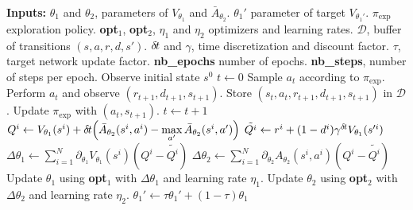 \begin{algorithmic}
	\STATE \textbf{Inputs:}
	\STATE $\theta_1$ and $\theta_2$, parameters of
	$V_{\theta_1}$ and $\bar{A}_{\theta_2}$.
	\STATE $\theta_1'$ parameter of target $V_{\theta_1'}$.
	\STATE $\pi_{\text{exp}}$ exploration policy.
	\STATE \textbf{opt}$_1$, \textbf{opt}$_2$, $\eta_1$ and $\eta_2$ optimizers and learning rates.
	\STATE $\mathcal{D}$, buffer of transitions $(s, a, r, d, s')$.
	\STATE $\delta\hspace{-.1em}t$ and $\gamma$, time discretization and discount factor.
	\STATE $\tau$, target network update factor.
	\STATE \textbf{nb\_epochs} number of epochs.
	\STATE \textbf{nb\_steps}, number of steps per epoch.
	\STATE
	\STATE Observe initial state $s^0$
	\STATE $t \gets 0$
	\STATE Sample $a_t$ according to $\pi_{\text{exp}}$.
	\STATE Perform $a_t$ and observe $(r_{t+1}, d_{t+1}, s_{t+1})$.
	\STATE Store $(s_t, a_t, r_{t+1}, d_{t+1}, s_{t+1})$ in $\mathcal{D}$.
	\STATE Update $\pi_{\text{exp}}$ with $(a_t, s_{t+1})$.
	\STATE $t \gets t + 1$
	\ENDFOR
	\STATE {}
	\STATE $Q^i \gets V_{\theta_1}(s^i) + \delta\hspace{-.1em}t\hspace{-.17em}\left(
	\bar{A}_{\theta_2}(s^i, a^i) - \max\limits_{a'}\bar{A}_{\theta_2}(s^i, a')\right)$
	\STATE $\tilde{Q^i} \gets r^i + (1 - d^i) \gamma^{\delta\hspace{-.1em}t} V_{\theta_1}(s'^i)$
	\STATE $\Delta \theta_1 \gets \sum\limits_{i=1}^N \partial_{\theta_1} V_{\theta_1}(s^i) (Q^i - \tilde{Q^i})$
	\STATE $\Delta \theta_2 \gets \sum\limits_{i=1}^N \partial_{\theta_2} A_{\theta_2}(s^i, a^i) (Q^i - \tilde{Q^i})$
	\STATE Update $\theta_1$ using \textbf{opt}$_1$ with $\Delta \theta_1$ and learning rate $\eta_1$.
	\STATE Update $\theta_2$ using \textbf{opt}$_2$ with $\Delta \theta_2$ and learning rate $\eta_2$.
	\STATE $\theta_1' \gets \tau \theta_1' + (1 - \tau) \theta_1$
	\ENDFOR
	\ENDFOR
\end{algorithmic}
